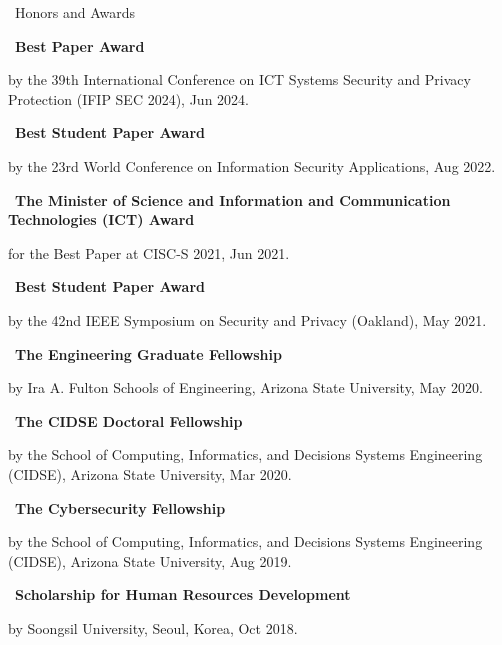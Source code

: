 \documentclass{resume} %
\begin{document}
\begin{rSection}{\faGenderless~Honors and Awards}
	\strut\textbullet~{\bf Best Paper Award}\\
    \strut\hspace{1cm}\parbox[t]{\linegoal}{by the 39th International Conference on ICT Systems Security and Privacy Protection (IFIP SEC 2024), Jun 2024.}

    \strut\textbullet~{\bf Best Student Paper Award}\\
    \strut\hspace{1cm}\parbox[t]{\linegoal}{by the 23rd World Conference on Information Security Applications, Aug 2022.}
	
    \strut\textbullet~{\bf The Minister of Science and Information and Communication Technologies (ICT) Award}\\
    \strut\hspace{1cm}\parbox[t]{\linegoal}{for the Best Paper at CISC-S 2021, Jun 2021.}

	\strut\textbullet~{\bf Best Student Paper Award}\\
    \strut\hspace{1cm}\parbox[t]{\linegoal}{by the 42nd IEEE Symposium on Security and Privacy (Oakland), May 2021.}

    \strut\textbullet~{\bf The Engineering Graduate Fellowship}\\
    \strut\hspace{1cm}\parbox[t]{\linegoal}{by Ira A. Fulton Schools of Engineering, Arizona State University, May 2020.}

    \strut\textbullet~{\bf The CIDSE Doctoral Fellowship}\\
    \strut\hspace{1cm}\parbox[t]{\linegoal}{by the School of Computing, Informatics, and Decisions Systems Engineering (CIDSE), Arizona State University, Mar 2020.}

    \strut\textbullet~{\bf The Cybersecurity Fellowship}\\
    \strut\hspace{1cm}\parbox[t]{\linegoal}{by the School of Computing, Informatics, and Decisions Systems Engineering (CIDSE), Arizona State University, Aug 2019.}

	\strut\textbullet~{\bf Scholarship for Human Resources Development}\\
	\strut\hspace{1cm}by Soongsil University, Seoul, Korea, Oct 2018.


\end{rSection}
\end{document}
